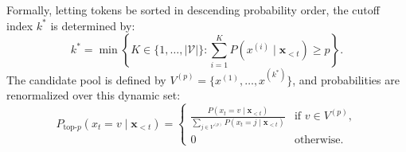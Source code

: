 \documentclass[../../main.tex]{subfiles}
\begin{document}
Formally, letting tokens be sorted in descending probability order, the cutoff index $k^*$ is determined by:
\begin{equation}
k^* = \min \left\{ K \in \{1, \dots, |\mathcal{V}|\} : \sum_{i=1}^K P(x^{(i)} \mid \mathbf{x}_{<t}) \ge p \right\}.
\label{eq:nucleus_cutoff_index}
\end{equation}
The candidate pool is defined by $V^{(p)} = \{x^{(1)}, \dots, x^{(k^*)}\}$, and probabilities are renormalized over this dynamic set:
\begin{equation}
P_{\text{top-}p}(x_t = v \mid \mathbf{x}_{<t}) = \begin{cases}
\frac{P(x_t = v \mid \mathbf{x}_{<t})}{\sum_{j \in V^{(p)}} P(x_t = j \mid \mathbf{x}_{<t})} & \text{if } v \in V^{(p)}, \\
0 & \text{otherwise}.
\end{cases}
\label{eq:nucleus_renormalization}
\end{equation}
\end{document}
